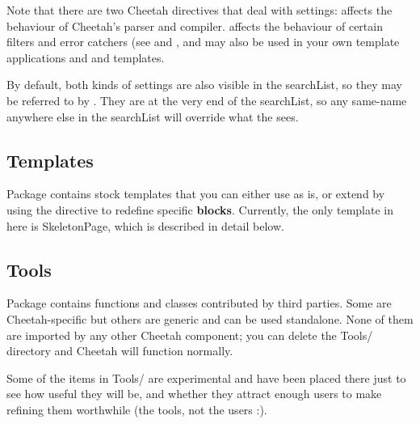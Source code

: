 Note that there are two Cheetah directives that deal with settings:
 affects the behaviour of Cheetah's parser and 
compiler.   affects the behaviour of certain filters and
error catchers (see  and , and may also be
used in your own template applications and and templates.

By default, both kinds of settings are also visible in the searchList, so they
may be referred to by .  They are at the very end of the
searchList, so any same-name anywhere else in the searchList will override
what the  sees.



\subsection{Templates}
\label{libraries.templates}

Package  contains stock templates that you can
either use as is, or extend by using the  directive to redefine
specific {\bf blocks}.  Currently, the only template in here is SkeletonPage,
which is described in detail below.

\subsection{Tools}
\label{libraries.Tools}

Package  contains functions and classes contributed by third
parties.  Some are Cheetah-specific but others are generic and can be used
standalone.  None of them are imported by any other Cheetah component; you can 
delete the Tools/ directory and Cheetah will function normally.  

Some of the items in Tools/ are experimental and have been placed there just to
see how useful they will be, and whether they attract enough users to make 
refining them worthwhile (the tools, not the users :).

